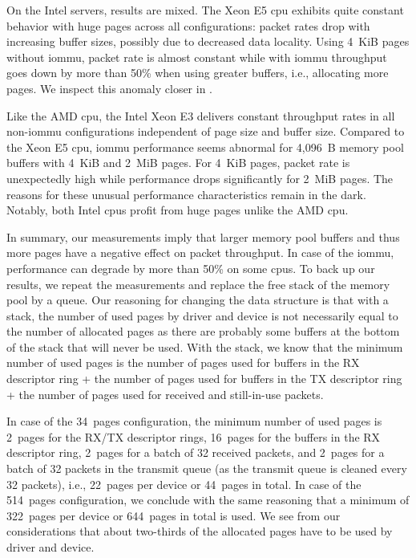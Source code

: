 On the Intel servers, results are mixed. The Xeon E5 \ac{cpu} exhibits quite
constant behavior with huge pages across all configurations: packet rates drop
with increasing buffer sizes, possibly due to decreased data locality. Using
4~KiB pages without \ac{iommu}, packet rate is almost constant while with
\ac{iommu} throughput goes down by more than 50\% when using greater buffers,
i.e., allocating more pages. We inspect this anomaly closer in
.

Like the AMD \ac{cpu}, the Intel Xeon E3 delivers constant throughput rates in
all non-\ac{iommu} configurations independent of page size and buffer size.
Compared to the Xeon E5 \ac{cpu}, \ac{iommu} performance seems abnormal for
4,096~B memory pool buffers with 4~KiB and 2~MiB pages. For 4~KiB pages, packet
rate is unexpectedly high while performance drops significantly for 2~MiB pages.
The reasons for these unusual performance characteristics remain in the dark.
Notably, both Intel \acp{cpu} profit from huge pages unlike the AMD \ac{cpu}.

In summary, our measurements imply that larger memory pool buffers and thus more
pages have a negative effect on packet throughput. In case of the \ac{iommu},
performance can degrade by more than 50\% on some \acp{cpu}. To back up our
results, we repeat the measurements and replace the free stack of the memory
pool by a queue. Our reasoning for changing the data structure is that with a
stack, the number of used pages by driver and device is not necessarily equal to
the number of allocated pages as there are probably some buffers at the bottom
of the stack that will never be used. With the stack, we know that the minimum
number of used pages is the number of pages used for buffers in the RX
descriptor ring + the number of pages used for buffers in the TX descriptor ring
+ the number of pages used for received and still-in-use packets.

In case of the 34~pages configuration, the minimum number of used pages is
2~pages for the RX/TX descriptor rings, 16~pages for the buffers in the RX
descriptor ring, 2~pages for a batch of 32 received packets, and 2~pages for a
batch of 32 packets in the transmit queue (as the transmit queue is cleaned
every 32 packets), i.e., 22~pages per device or 44~pages in total. In case of
the 514~pages configuration, we conclude with the same reasoning that a minimum
of 322~pages per device or 644~pages in total is used. We see from our
considerations that about two-thirds of the allocated pages have to be used by
driver and device.

